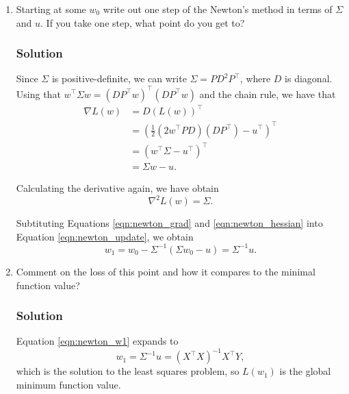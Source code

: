 \documentclass[letterpaper,11pt]{article}
\begin{document}
\begin{enumerate}
\item Starting at some $w_0$ write out one step of the Newton's method in terms
  of $\Sigma$ and $u$. If you take one step, what point do you get to?

  \subsubsection*{Solution}

  Since $\Sigma$ is positive-definite, we can write $\Sigma = PD^2P^\intercal$,
  where $D$ is diagonal. Using that
  $w^\intercal \Sigma w = \left(D P^\intercal
    w\right)^\intercal\left(DP^\intercal w\right)$ and the chain rule, we have
  that
  \begin{align}
    \nabla L(w)
    &= D\left(L(w)\right)^\intercal \nonumber\\
    &= \left(\frac{1}{2} \left(2w^\intercal PD\right)\left(D P^\intercal\right)  - u^\intercal\right)^\intercal \nonumber\\
    &= \left(w^\intercal \Sigma - u^\intercal\right)^\intercal \nonumber\\
    &= \Sigma w - u.
      \label{eqn:newton_grad}
  \end{align}

  Calculating the derivative again, we have obtain
  \begin{equation}
    \nabla^2 L\left( w \right) = \Sigma.
    \label{eqn:newton_hessian}
  \end{equation}

  Subtituting Equations \ref{eqn:newton_grad} and \ref{eqn:newton_hessian} into
  Equation \ref{eqn:newton_update}, we obtain
  \begin{equation}
    w_1 = w_0 - \Sigma^{-1}\left(
      \Sigma w_0 - u
    \right) = \boxed{\Sigma^{-1} u.}
    \label{eqn:newton_w1}
  \end{equation}
  
\item Comment on the loss of this point and how it compares to the minimal
  function value?
  
  \subsubsection*{Solution}

  Equation \ref{eqn:newton_w1} expands to
  \begin{equation}
    w_1 = \Sigma^{-1} u = \left(X^\intercal X\right)^{-1}X^\intercal Y,
  \end{equation}
  which is the solution to the least squares problem, so $L(w_1)$ is the global
  minimum function value.
\end{enumerate}
\end{document}
